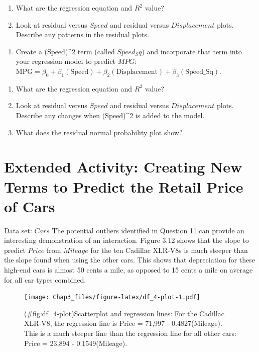 \documentclass[
]{report}
\providecommand{\tightlist}{%
  \setlength{\itemsep}{0pt}\setlength{\parskip}{0pt}}
\begin{document}
\begin{enumerate}
\def\labelenumi{\alph{enumi}.}
\tightlist
\item
  What are the regression equation and \(R^2\) value?
\item
  Look at residual versus \(Speed\) and residual versus \(Displacement\) plots. Describe any patterns in the residual plots.
\end{enumerate}

\begin{enumerate}
\def\labelenumi{\arabic{enumi}.}
\setcounter{enumi}{39}
\tightlist
\item
  Create a (\(\mathrm{Speed}\))\^{}2 term (called \(Speed_Sq\)) and incorporate that term into your regression model to predict \(MPG\): \(\mathrm{MPG} = \beta_0 + \beta_1(\mathrm{Speed}) + \beta_2(\mathrm{Displacement}) + \beta_3(\mathrm{Speed\_Sq}).\)
\end{enumerate}

\begin{enumerate}
\def\labelenumi{\alph{enumi}.}
\tightlist
\item
  What are the regression equation and \(R^2\) value?
\item
  Look at residual versus \(Speed\) and residual versus \(Displacement\) plots. Describe any changes when (\(\mathrm{Speed}\))\^{}2 is added to the model.
\item
  What does the residual normal probability plot show?
\end{enumerate}

\section*{Extended Activity: Creating New Terms to Predict the Retail Price of Cars}\label{extended-activity-creating-new-terms-to-predict-the-retail-price-of-cars}

Data set: \(Cars\)
The potential outliers identified in Question 11 can provide an interesting demonstration of an interaction. Figure 3.12 shows that the slope to predict \(Price\) from \(Mileage\) for the ten Cadillac XLR-V8s is much steeper than the slope found when using the other cars. This shows that depreciation for these high-end cars is almost 50 cents a mile, as opposed to 15 cents a mile on average for all car types combined.

\begin{figure}
\centering
\texttt{[image: Chap3\_files/figure-latex/df\_4-plot-1.pdf]}
\caption{(\#fig:df\_4-plot)Scatterplot and regression lines: For the Cadillac XLR-V8, the regression line is Price = 71,997 - 0.4827(Mileage). This is a much steeper line than the regression line for all other cars: Price = 23,894 - 0.1549(Mileage).}
\end{figure}
\end{document}
